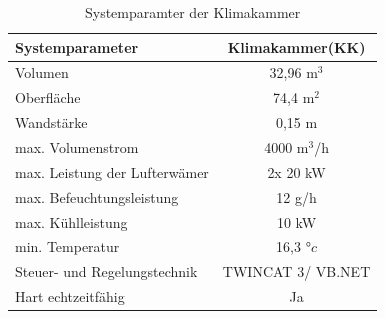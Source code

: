 \begin{table}[htb]
\centering
\caption{Systemparamter der Klimakammer \citep{Nuerenberg2015}}\vspace{6pt}
\label{tab:Parameter KK}
\begin{tabular}{lc}
\hline 
\textbf{Systemparameter} & \textbf{Klimakammer(KK)} \\ 
\hline 
\hline
Volumen & 32,96 m$^3$ \\ 
\hline 
Oberfläche & 74,4 m$^2$ \\ 
\hline 
Wandstärke & 0,15 m \\ 
\hline 
max. Volumenstrom & 4000 m$^3$/h \\ 
\hline 
max. Leistung der Lufterwämer & 2x 20 kW \\ 
\hline 
max. Befeuchtungsleistung & 12 g/h \\ 
\hline 
max. Kühlleistung & 10 kW \\ 
\hline 
min. Temperatur & 16,3 $°c$ \\ 
\hline 
Steuer- und Regelungstechnik & TWINCAT 3/ VB.NET \\ 
\hline 
Hart echtzeitfähig & Ja \\ 
\hline 
\hline
\end{tabular} 
\label{tab:Systemparameter-KK}
\end{table} 

